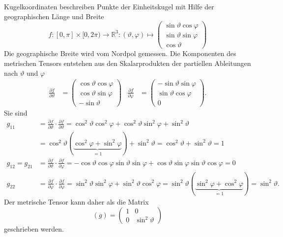 \begin{beispiel}
\label{buch:zusammenhang:paralleltransport:bsp:kugel}
Kugelkoordinaten beschreiben Punkte der Einheitskugel mit Hilfe der
geographischen Länge und Breite 
\[
f\colon
[0,\pi] \times [0,2\pi)
\to
\mathbb{R}^3
:
(\vartheta,\varphi)
\mapsto
\begin{pmatrix}
\sin\vartheta \cos\varphi\\
\sin\vartheta \sin\varphi\\
\cos\vartheta
\end{pmatrix}
\]
Die geographische Breite wird vom Nordpol gemessen.
Die Komponenten des metrischen Tensors entstehen aus den Skalarprodukten
der partiellen Ableitungen nach $\vartheta$ und $\varphi$
\begin{align*}
\frac{\partial f}{\partial \vartheta}
&=
\begin{pmatrix}
\cos\vartheta \cos\varphi \\
\cos\vartheta \sin\varphi \\
-\sin\vartheta
\end{pmatrix}
&
\frac{\partial f}{\partial \varphi}
&=
\begin{pmatrix}
-\sin\vartheta\sin\varphi\\
 \sin\vartheta\cos\varphi\\
0
\end{pmatrix}.
\end{align*}
Sie sind
\begin{align*}
g_{11}
&=
\frac{\partial f}{\partial\vartheta}
\cdot
\frac{\partial f}{\partial\vartheta}
=
\cos^2\vartheta\cos^2\varphi+\cos^2\vartheta\sin^2\varphi+\sin^2\vartheta
\\
&=
\cos^2\vartheta(\underbrace{\cos^2\varphi+\sin^2\varphi}_{\displaystyle=1})+\sin^2\vartheta
=\cos^2\vartheta+\sin^2\vartheta=1
\\
g_{12}=g_{21}
&=
\frac{\partial f}{\partial\vartheta}
\cdot
\frac{\partial f}{\partial\varphi}
=
-\cos\vartheta\cos\varphi\sin\vartheta\sin\varphi
+\cos\vartheta\sin\varphi\sin\vartheta\cos\varphi
=
0
\\
g_{22}
&=
\frac{\partial f}{\partial\varphi}
\cdot
\frac{\partial f}{\partial\varphi}
=
\sin^2\vartheta\sin^2\varphi+\sin^2\vartheta\cos^2\varphi
=
\sin^2\vartheta(\underbrace{\sin^2\varphi+\cos^2\varphi}_{\displaystyle=1})
=
\sin^2\vartheta.
\end{align*}
Der metrische Tensor kann daher als die Matrix
\[
(g)
=
\begin{pmatrix}
1&0\\
0&\sin^2\vartheta
\end{pmatrix}
\]
geschrieben werden.


\end{beispiel}
